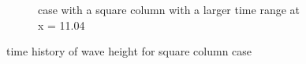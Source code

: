 \documentclass[11pt]{article}
\begin{document}
\begin{figure}[h!]
\begin{subfigure}[b]{0.4\textwidth}
        \caption{case with a square column with a larger time range at x = 11.04}
        \label{fig:waveheight_square_x=11.04}
    \end{subfigure}
    \caption{time history of wave height for square column case}
\end{figure}

\end{document}
